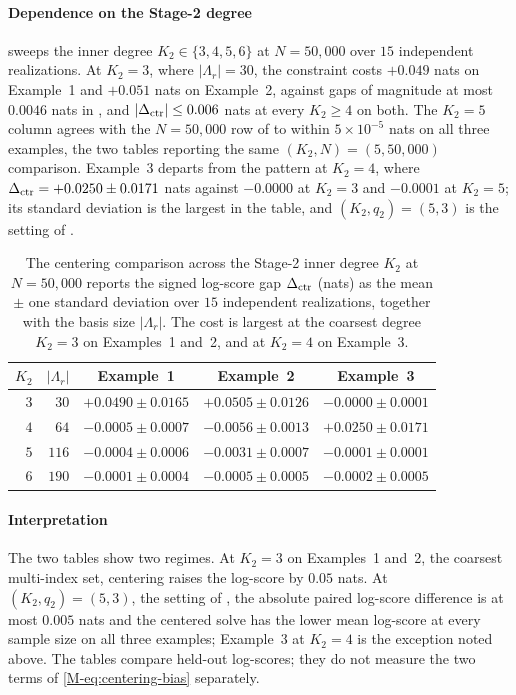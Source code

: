 \documentclass[supplement,review,hidelinks,onefignum,onetabnum]{siamart251216}
\begin{document}
\paragraph{Dependence on the Stage-2 degree}  sweeps the inner degree $K_2 \in \{3, 4, 5, 6\}$ at $N = 50{,}000$ over $15$ independent realizations. At $K_2 = 3$, where $|\Lambda_r| = 30$, the constraint costs $+0.049$ nats on Example~1 and $+0.051$ nats on Example~2, against gaps of magnitude at most $0.0046$ nats in , and $|\Delta_{\rm ctr}| \le 0.006$ nats at every $K_2 \ge 4$ on both. The $K_2 = 5$ column agrees with the $N = 50{,}000$ row of  to within $5\times10^{-5}$ nats on all three examples, the two tables reporting the same $(K_2, N) = (5, 50{,}000)$ comparison. Example~3 departs from the pattern at $K_2 = 4$, where $\Delta_{\rm ctr} = +0.0250 \pm 0.0171$ nats against $-0.0000$ at $K_2 = 3$ and $-0.0001$ at $K_2 = 5$; its standard deviation is the largest in the table, and $(K_2, q_2) = (5,3)$ is the setting of .

\begin{table}[h]
\centering\small
\setlength{\tabcolsep}{5pt}
\caption{The centering comparison across the Stage-2 inner degree $K_2$ at $N = 50{,}000$ reports the signed log-score gap $\Delta_{\rm ctr}$ (nats) as the mean $\pm$ one standard deviation over $15$ independent realizations, together with the basis size $|\Lambda_r|$. The cost is largest at the coarsest degree $K_2 = 3$ on Examples~1 and~2, and at $K_2 = 4$ on Example~3.}
\label{tab:sm2-centering-k2}
\begin{tabular}{rr|ccc}
\toprule
$K_2$ & $|\Lambda_r|$ & Example~1 & Example~2 & Example~3 \\
\midrule
$3$ & $30$  & $+0.0490{\pm}0.0165$ & $+0.0505{\pm}0.0126$ & $-0.0000{\pm}0.0001$ \\
$4$ & $64$  & $-0.0005{\pm}0.0007$ & $-0.0056{\pm}0.0013$ & $+0.0250{\pm}0.0171$ \\
$5$ & $116$ & $-0.0004{\pm}0.0006$ & $-0.0031{\pm}0.0007$ & $-0.0001{\pm}0.0001$ \\
$6$ & $190$ & $-0.0001{\pm}0.0004$ & $-0.0005{\pm}0.0005$ & $-0.0002{\pm}0.0005$ \\
\bottomrule
\end{tabular}
\end{table}

\paragraph{Interpretation} The two tables show two regimes. At $K_2 = 3$ on Examples~1 and~2, the coarsest multi-index set, centering raises the log-score by $0.05$ nats. At $(K_2, q_2) = (5, 3)$, the setting of , the absolute paired log-score difference is at most $0.005$ nats and the centered solve has the lower mean log-score at every sample size on all three examples; Example~3 at $K_2 = 4$ is the exception noted above. The tables compare held-out log-scores; they do not measure the two terms of \eqref{M-eq:centering-bias} separately.
\end{document}
